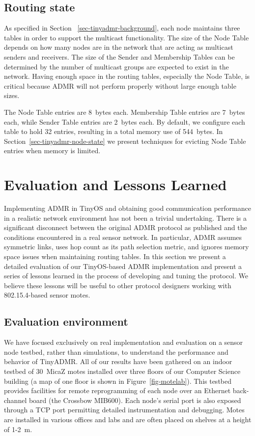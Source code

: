 \subsection{Routing state}

As specified in Section ~\ref{sec-tinyadmr-background}, each node maintains
three tables in order to support the multicast functionality. 
The size of the Node Table depends on how many
nodes are in the network that are acting as multicast senders and receivers.
The size of the Sender and Membership Tables can be determined by 
the number of multicast groups are expected to exist in the network.
Having enough space in the routing tables, especially 
the Node Table, is critical 
because ADMR will not perform properly without large enough table sizes.

The Node Table entries are 8~bytes each. Membership Table entries 
are 7~bytes each, while Sender Table entries are 2~bytes each. By 
default, 
we configure each table to hold 32 entries, resulting in a total
memory use of 544~bytes. In Section~\ref{sec-tinyadmr-node-state} we present
techniques for evicting Node Table entries when memory is limited.


\section{Evaluation and Lessons Learned}
\label{sec-tinyadmr-lessons}

Implementing ADMR in TinyOS and obtaining good communication performance 
in a realistic network environment has not been a trivial undertaking. 
There is a significant disconnect between the original ADMR protocol
as published and the conditions encountered in a real sensor network.
In particular, ADMR assumes symmetric links, uses hop count as
its path selection metric, and ignores memory space issues when
maintaining routing tables. In this section we present a detailed
evaluation of our TinyOS-based ADMR implementation and present a
series of lessons learned in the process of developing and tuning the
protocol. We believe these lessons will be useful to other protocol
designers working with 802.15.4-based sensor motes.

\subsection{Evaluation environment}

We have focused exclusively on real implementation and evaluation on a
sensor node testbed, rather than simulations, to understand the
performance and behavior of TinyADMR. All of our results have been
gathered on an indoor testbed of 30~MicaZ motes installed over three
floors of our Computer Science building (a map of one floor is shown
in Figure~\ref{fig-motelab}). This testbed provides facilities 
for remote reprogramming of each node over an Ethernet back-channel 
board (the Crossbow MIB600). Each node's serial port is also 
exposed through a TCP port permitting detailed instrumentation and debugging.
Motes are installed in various offices and labs and are often placed 
on shelves at a height of 1-2~m. 

